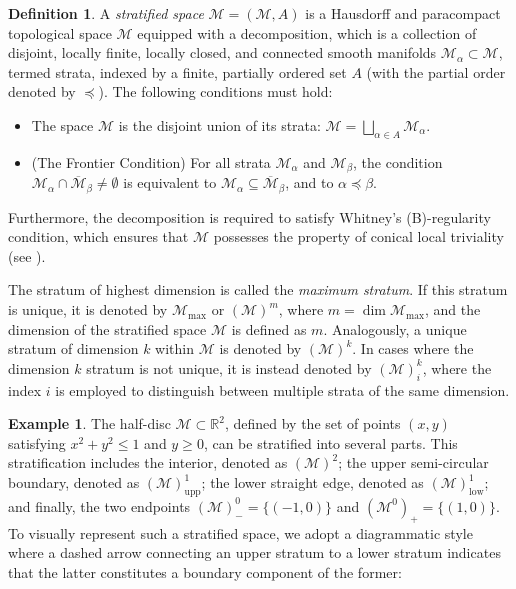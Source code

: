\documentclass[12pt]{amsart}
\theoremstyle{definition}
\newtheorem{definition}[theorem]{Definition}
\newtheorem{example}[theorem]{Example}
\numberwithin{equation}{section}
\newcommand{\maxpart}{\mathrm{max}}
\newcommand{\lowpart}{\mathrm{low}}
\newcommand{\partialless}{\preccurlyeq}
\begin{document}
{\begin{definition}
	A \textit{stratified space} $\mathcal{M}=(\mathcal{M},{A})$ is a Hausdorff and paracompact topological space $\mathcal{M}$ equipped with a decomposition, which is a collection of disjoint, locally finite, locally closed, and connected smooth manifolds $\mathcal{M}_\alpha\subset \mathcal{M}$, termed strata, indexed by a finite, partially ordered set ${A}$ (with the partial order denoted by $\partialless $). The following conditions must hold:
	\begin{itemize}
		\item The space $\mathcal{M}$ is the disjoint union of its strata: $\mathcal{M}=\bigsqcup_{\alpha\in{A}} \mathcal{M}_{\alpha}$.
		\item (The Frontier Condition) For all  strata $\mathcal{M}_{\alpha}$ and $\mathcal{M}_{\beta}$, the condition $\mathcal{M}_{\alpha}\cap \overline{\mathcal{M}}_{\beta}\neq \emptyset$ is equivalent to   $\mathcal{M}_{\alpha}\subseteq \overline{\mathcal{M}}_{\beta}$, and to  $\alpha\partialless \beta$.
	\end{itemize}
	Furthermore, the decomposition is required to satisfy Whitney's  (B)-regularity condition, which ensures that $\mathcal{M}$ possesses the property of conical local triviality (see \cite{Pflaumpaper,Pflaumbook}).
\end{definition}





 
 The stratum of highest dimension is called the \textit{maximum stratum}. If this stratum is unique, it is denoted by $\mathcal{M}_{\maxpart}$ or $(\mathcal{M})^m$, where $m = \dim \mathcal{M}_{\maxpart}$, and the dimension of the stratified space $\mathcal{M}$ is defined as $m$. Analogously, a unique stratum of dimension $k$ within $\mathcal{M} $ is denoted by $(\mathcal{M})^k$. In cases where the dimension $k$ stratum is not unique, it is instead denoted by $(\mathcal{M})^k_i$, where the index $i$ is employed to distinguish between multiple strata of the same dimension.

\begin{example}\label{Example:demodashlines} The half-disc $\mathcal{M}  \subset \mathbb{R}^2$, defined by the set of points $(x, y)$ satisfying $x^2 + y^2 \leqslant 1$ and $y \geqslant 0$, can be stratified into several parts. This stratification includes the interior, denoted as $(\mathcal{M})^2$; the upper semi-circular boundary, denoted as $(\mathcal{M})^1_{\mathrm{upp}}$; the lower straight edge, denoted as $(\mathcal{M})^1_{\lowpart}$; and finally, the two endpoints $(\mathcal{M})^0_{-} = \{(-1, 0)\}$ and $(\mathcal{M}^{0 })_{ +} = \{(1, 0)\}$. To visually represent such a stratified space, we adopt a diagrammatic style where a dashed arrow  connecting an upper stratum to a lower stratum indicates that the latter constitutes a boundary component of the former:
	

\end{example}}
\end{document}
